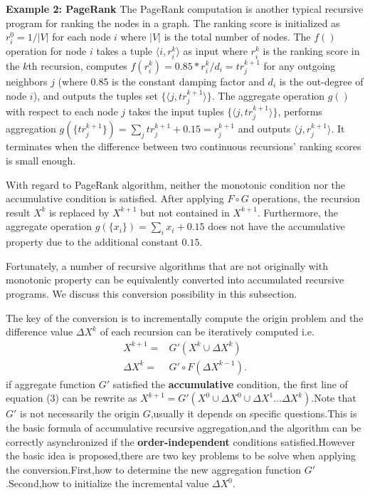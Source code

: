 \textbf{Example 2: PageRank} The PageRank computation is another typical recursive program for ranking the nodes in a graph. The ranking score is initialized as $r_i^0=1/|V|$ for each node $i$ where $|V|$ is the total number of nodes. The $f()$ operation for node $i$ takes a tuple $\langle i,r_i^k\rangle$ as input where $r_i^k$ is the ranking score in the $k$th recursion, computes $f(r_i^k)=0.85*r_i^k/d_i=tr_j^{k+1}$ for any outgoing neighbors $j$ (where 0.85 is the constant damping factor and $d_i$ is the out-degree of node $i$), and outputs the tuples set $\{\langle j,tr_j^{k+1}\rangle\}$. The aggregate operation $g()$ with respect to each node $j$ takes the input tuples $\{\langle j,tr_j^{k+1}\rangle\}$, performs aggregation $g(\{tr_j^{k+1}\})=\sum_j{tr_j^{k+1}}+0.15=r_j^{k+1}$ and outputs $\langle j,r_j^{k+1}\rangle$. It terminates when the difference between two continuous recursions' ranking scores is small enough.

With regard to PageRank algorithm, neither the monotonic condition nor the accumulative condition is satisfied. After applying $F\circ G$ operations, the recursion result $X^{k}$ is replaced by $X^{k+1}$ but not contained in $X^{k+1}$. Furthermore, the aggregate operation $g(\{x_i\})=\sum_i{x_i}+0.15$ does not have the accumulative property due to the additional constant $0.15$.

Fortunately, a number of recursive algorithms that are not originally with monotonic property can be equivalently converted into accumulated recursive programs. We discuss this conversion possibility in this subsection.

The key of the conversion is to incrementally compute the origin problem and the difference value $\Delta X^k$ of each recursion can be iteratively computed i.e.
\begin{equation}
\begin{aligned}
X^{k+1}=&G'(X^{k}\cup \Delta X^{k})\\
\Delta X^{k}=&G' \circ F(\Delta X^{k-1}).
\end{aligned}
\end{equation}
if aggregate function $G'$ satisfied the \textbf{accumulative} condition, the first line of equation (3) can be rewrite as $X^{k+1}=G'(X^0\cup \Delta X^0\cup \Delta X^1 \ldots \Delta X^k)$.Note that $G'$ is not necessarily the origin $G$,usually it depends on specific questions.This is the basic formula of accumulative recursive aggregation,and the algorithm can be correctly asynchronized if the \textbf{order-independent} conditions satisfied.However the basic idea is proposed,there are two key problems to be solve when applying the conversion.First,how to determine the new aggregation function $G'$ .Second,how to initialize the incremental value $\Delta X^0$.

